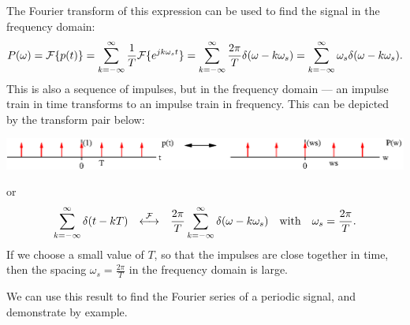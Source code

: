 \documentclass[10pt]{beamer}
\newcommand{\ftpair}{{\stackrel{\cal F}{\longleftrightarrow}}}
\begin{document}
The Fourier transform of this expression can be used to find the signal in the frequency domain:
\begin{equation*}
  P(\omega) = {\cal F}\{p(t)\} 
  = \sum_{k=-\infty}^{\infty} \frac{1}{T} {\cal F}\{ e^{j k \omega_s t} \}
  = \sum_{k=-\infty}^{\infty} \frac{2 \pi}{T} \delta(\omega - k \omega_s)
  = \sum_{k=-\infty}^{\infty} \omega_s \delta(\omega - k \omega_s).
\end{equation*}
This is also a sequence of impulses, but in the frequency domain --- an impulse train in time transforms to an impulse train in frequency.  This can be depicted by the transform pair below:
\begin{center}
  \includegraphics{imptraintf}
\end{center}
or
\begin{equation*}
  \sum_{k=-\infty}^{\infty} \delta(t - kT) \quad \ftpair \quad 
  \frac{2 \pi}{T} \sum_{k=-\infty}^{\infty} \delta(\omega - k \omega_s) \quad \text{with} \quad \omega_s = \frac{2 \pi}{T}.
\end{equation*}
If we choose a small value of $T$, so that the impulses are close together in time, then the spacing $\omega_s = \frac{2 \pi}{T}$ in the frequency domain is large.

We can use this result to find the Fourier series of a periodic signal, and demonstrate by example.
\end{document}
